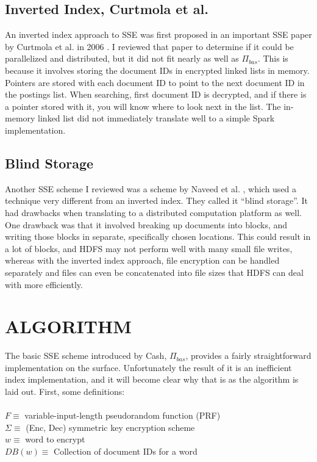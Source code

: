 \documentclass{sig-alternate-05-2015}
\begin{document}
\subsection{Inverted Index, Curtmola et al.}
An inverted index approach to SSE was first proposed in an important SSE paper by Curtmola et al. in 2006 \cite{curtmola.2006}. I reviewed that paper to determine if it could be parallelized and distributed, but it did not fit nearly as well as $\Pi_{bas}$. This is because it involves storing the document IDs in encrypted linked lists in memory. Pointers are stored with each document ID to point to the next document ID in the postings list. When searching, first document ID is decrypted, and if there is a pointer stored with it, you will know where to look next in the list. The in-memory linked list did not immediately translate well to a simple Spark implementation.

\subsection{Blind Storage}
Another SSE scheme I reviewed was a scheme by Naveed et al. \cite{naveed.2014}, which used a technique very different from an inverted index. They called it ``blind storage''. It had drawbacks when translating to a distributed computation platform as well. One drawback was that it involved breaking up documents into blocks, and writing those blocks in separate, specifically chosen locations. This could result in a lot of blocks, and HDFS may not perform well with many small file writes, whereas with the inverted index approach, file encryption can be handled separately and files can even be concatenated into file sizes that HDFS can deal with more efficiently.

\section{ALGORITHM}
The basic SSE scheme introduced by Cash, $\Pi_{bas}$, provides a fairly straightforward implementation on the surface. Unfortunately the result of it is an inefficient index implementation, and it will become clear why that is as the algorithm is laid out. First, some definitions:
\\\\
$F \equiv $ variable-input-length pseudorandom function (PRF) \\
$\Sigma \equiv $ (Enc, Dec) symmetric key encryption scheme \\
$w \equiv $ word to encrypt \\
$DB(w) \equiv$ Collection of document IDs for a word \\
\\
\end{document}
